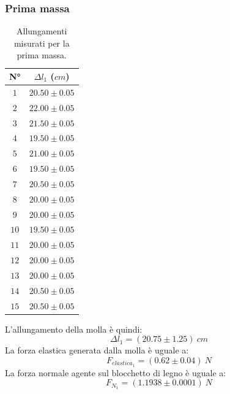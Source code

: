 \documentclass[11pt]{article}
\begin{document}
\subsubsection{Prima massa}
\begin{table}[H]
\centering
\begin{tabular}{|c|c|}
\hline
\textbf{N°} & \textbf{$\Delta l_1$ ($cm$)}\\
\hline
$1$ & $20.50\pm 0.05$ \\
\hline
$2$ & $22.00\pm 0.05$ \\
\hline
$3$ & $21.50\pm 0.05$ \\
\hline
$4$ & $19.50\pm 0.05$ \\
\hline
$5$ & $21.00\pm 0.05$ \\
\hline
$6$ & $19.50\pm 0.05$ \\
\hline
$7$ & $20.50\pm 0.05$ \\
\hline
$8$ & $20.00\pm 0.05$ \\
\hline
$9$ & $20.00\pm 0.05$ \\
\hline
$10$ & $19.50\pm 0.05$ \\
\hline
$11$ & $20.00\pm 0.05$ \\
\hline
$12$ & $20.00\pm 0.05$ \\
\hline
$13$ & $20.00\pm 0.05$ \\
\hline
$14$ & $20.50\pm 0.05$ \\
\hline
$15$ & $20.50\pm 0.05$ \\
\hline
\end{tabular}
\caption{Allungamenti misurati per la prima massa.}
\label{tab:}
\end{table}
L'allungamento della molla è quindi:
\begin{equation}
    \Delta l_1=(20.75\pm 1.25)\ cm
\end{equation}
La forza elastica generata dalla molla è uguale a:
\begin{equation}
    F_{elastica_1} = (0.62\pm 0.04)\ N
\end{equation}
La forza normale agente sul blocchetto di legno è uguale a:
\begin{equation}
    F_{N_1} = (1.1938\pm 0.0001)\ N
\end{equation}
\end{document}
